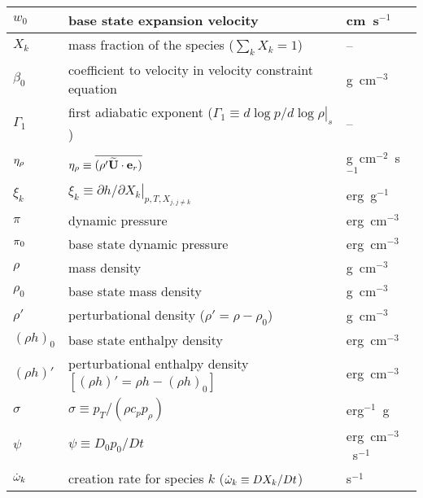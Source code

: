 \begin{center}
\begin{longtable}{|l|p{4.0in}|l|}
\hline
$w_0$   & base state expansion velocity              & cm~s$^{-1}$ \\
\hline
$X_k$   & mass fraction of the species ($\sum_k X_k = 1$) & -- \\
\hline
$\beta_0$ & coefficient to velocity
            in velocity constraint equation  & g~cm$^{-3}$ \\
\hline
$\Gamma_1$ & first adiabatic exponent ($\Gamma_1 \equiv \left . d \log p/d \log \rho \right |_s$) & -- \\
\hline
$\eta_{\rho}$ & $\eta_{\rho} \equiv \overline{ (\rho' \widetilde{{\bf U}} \cdot \mathbf{e}_r)}$ & g~cm$^{-2}$~s$^{-1}$ \\
\hline
$\xi_k$ & $\xi_k \equiv \left . \partial h / \partial X_k \right |_{p,T,X_{j,j\ne k}}$ & erg~g$^{-1}$ \\
\hline 
$\pi$   & dynamic pressure & erg~cm$^{-3}$ \\
\hline
$\pi_0$ & base state dynamic pressure & erg~cm$^{-3}$ \\
\hline
$\rho$  & mass density  & g~cm$^{-3}$ \\
\hline
$\rho_0$  & base state mass density  & g~cm$^{-3}$ \\
\hline
$\rho'$  & perturbational density ($\rho' = \rho - \rho_0$) & g~cm$^{-3}$ \\
\hline
$(\rho h)_0$ & base state enthalpy density & erg~cm$^{-3}$  \\
\hline
$(\rho h)'$ & perturbational enthalpy density 
              $ \left [(\rho h)' = \rho h - (\rho h)_0 \right ]$ & erg~cm$^{-3}$  \\
\hline
$\sigma$ & $\sigma \equiv p_T/(\rho c_p p_\rho)$ & erg$^{-1}$~g \\
\hline
$\psi$  & $\psi \equiv D_0 p_0/Dt$ & erg~cm$^{-3}$~s$^{-1}$ \\
\hline
$\dot{\omega}_k$ & creation rate for species $k$ ($\dot{\omega}_k \equiv DX_k/Dt$) & s$^{-1}$ \\
\end{longtable}
\end{center}
%
\renewcommand{\arraystretch}{1.0}


